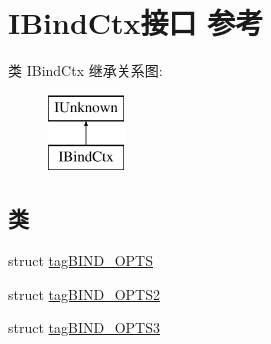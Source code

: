 \hypertarget{interface_i_bind_ctx}{}\section{I\+Bind\+Ctx接口 参考}
\label{interface_i_bind_ctx}
类 I\+Bind\+Ctx 继承关系图\+:\begin{figure}[H]
\begin{center}
\leavevmode
\includegraphics[height=2.000000cm]{interface_i_bind_ctx}
\end{center}
\end{figure}
\subsection*{类}
\begin{DoxyCompactItemize}
\item 
struct \hyperlink{struct_i_bind_ctx_1_1tag_b_i_n_d___o_p_t_s}{tag\+B\+I\+N\+D\+\_\+\+O\+P\+TS}
\item 
struct \hyperlink{struct_i_bind_ctx_1_1tag_b_i_n_d___o_p_t_s2}{tag\+B\+I\+N\+D\+\_\+\+O\+P\+T\+S2}
\item 
struct \hyperlink{struct_i_bind_ctx_1_1tag_b_i_n_d___o_p_t_s3}{tag\+B\+I\+N\+D\+\_\+\+O\+P\+T\+S3}
\end{DoxyCompactItemize}
